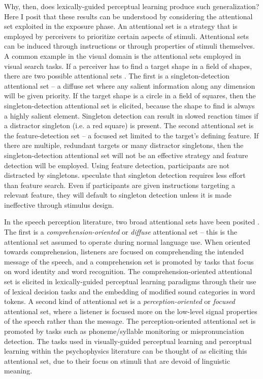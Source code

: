 Why, then, does lexically-guided perceptual learning produce such generalization?
Here I posit that these results can be understood by considering the attentional set exploited in the exposure phase.
An attentional set is a strategy that is employed by perceivers to prioritize certain aspects of stimuli.
Attentional sets can be induced through instructions or through properties of stimuli themselves.
A common example in the visual domain is the attentional sets employed in visual search tasks.
If a perceiver has to find a target shape in a field of shapes, there are two possible attentional sets \citep{Bacon1994}.
The first is a singleton-detection attentional set --  a diffuse set where any salient information along any dimension will be given priority.
If the target shape is a circle in a field of squares, then the singleton-detection attentional set is elicited, because the shape to find is always a highly salient element.
Singleton detection can result in slowed reaction times if a distractor singleton (i.e. a red square) is present.
The second attentional set is the feature-detection set -- a focused set limited to the target's defining feature.
If there are multiple, redundant targets or many distractor singletons, then the singleton-detection attentional set will not be an effective strategy and feature detection will be employed.
Using feature detection, participants are not distracted by singletons.
\citet{Bacon1994} speculate that singleton detection requires less effort than feature search.
Even if participants are given instructions targeting a relevant feature, they will default to singleton detection unless it is made ineffective through stimulus design.

In the speech perception literature, two broad attentional sets have been posited \citep{Cutler1987, Pitt2012}.  
The first is a \emph{comprehension-oriented} or \emph{diffuse} attentional set -- this is the attentional set assumed to operate during normal language use.  
When oriented towards comprehension, listeners are focused on comprehending the intended message of the speech, and a comprehension set is promoted by tasks that focus on word identity and word recognition.
The comprehension-oriented attentional set is elicited in lexically-guided perceptual learning paradigms through their use of lexical decision tasks and the embedding of modified sound categories in word tokens. 
A second kind of attentional set is a \emph{perception-oriented} or \emph{focused} attentional set, where a listener is focused more on the low-level signal properties of the speech rather than the message.
The perception-oriented attentional set is promoted by tasks such as phoneme/syllable monitoring or mispronunciation detection.
The tasks used in visually-guided perceptual learning and perceptual learning within the psychophysics literature can be thought of as eliciting this attentional set, due to their focus on stimuli that are devoid of linguistic meaning.

